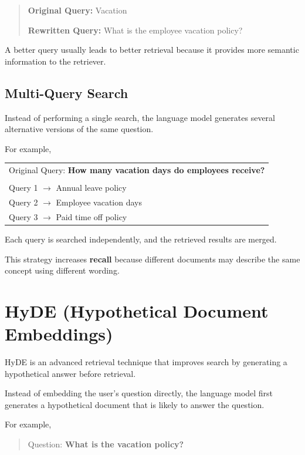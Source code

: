 \begin{quote}
\textbf{Original Query:} Vacation

\textbf{Rewritten Query:} What is the employee vacation policy?
\end{quote}

A better query usually leads to better retrieval because it provides more semantic information to the retriever.

\subsection*{Multi-Query Search}

Instead of performing a single search, the language model generates several alternative versions of the same question.

For example,

\begin{center}
\begin{tabular}{l}
Original Query: \textbf{How many vacation days do employees receive?} \\
\\
Query 1 $\rightarrow$ Annual leave policy \\
Query 2 $\rightarrow$ Employee vacation days \\
Query 3 $\rightarrow$ Paid time off policy
\end{tabular}
\end{center}

Each query is searched independently, and the retrieved results are merged.

This strategy increases \textbf{recall} because different documents may describe the same concept using different wording.
\section{HyDE (Hypothetical Document Embeddings)}

HyDE is an advanced retrieval technique that improves search by generating a hypothetical answer before retrieval.

Instead of embedding the user's question directly, the language model first generates a hypothetical document that is likely to answer the question.

For example,

\begin{quote}
Question: \textbf{What is the vacation policy?}
\end{quote}

